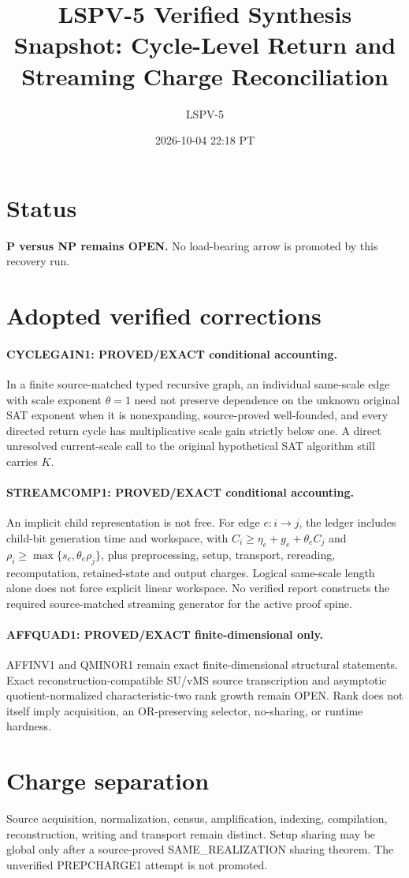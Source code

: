 \documentclass[11pt]{article}
\title{LSPV-5 Verified Synthesis Snapshot: Cycle-Level Return and Streaming Charge Reconciliation}
\author{LSPV-5}
\date{2026-10-04 22:18 PT}
\begin{document}
\maketitle
\section*{Status}
\textbf{P versus NP remains OPEN.} No load-bearing arrow is promoted by this recovery run.
\section*{Adopted verified corrections}
\paragraph{CYCLEGAIN1: PROVED/EXACT conditional accounting.} In a finite source-matched typed recursive graph, an individual same-scale edge with scale exponent $\theta=1$ need not preserve dependence on the unknown original SAT exponent when it is nonexpanding, source-proved well-founded, and every directed return cycle has multiplicative scale gain strictly below one. A direct unresolved current-scale call to the original hypothetical SAT algorithm still carries $K$.
\paragraph{STREAMCOMP1: PROVED/EXACT conditional accounting.} An implicit child representation is not free. For edge $e:i\to j$, the ledger includes child-bit generation time and workspace, with $C_i\ge \eta_e+g_e+\theta_e C_j$ and $\rho_i\ge\max\{s_e,\theta_e\rho_j\}$, plus preprocessing, setup, transport, rereading, recomputation, retained-state and output charges. Logical same-scale length alone does not force explicit linear workspace. No verified report constructs the required source-matched streaming generator for the active proof spine.
\paragraph{AFFQUAD1: PROVED/EXACT finite-dimensional only.} AFFINV1 and QMINOR1 remain exact finite-dimensional structural statements. Exact reconstruction-compatible SU/vMS source transcription and asymptotic quotient-normalized characteristic-two rank growth remain OPEN. Rank does not itself imply acquisition, an OR-preserving selector, no-sharing, or runtime hardness.
\section*{Charge separation}
Source acquisition, normalization, census, amplification, indexing, compilation, reconstruction, writing and transport remain distinct. Setup sharing may be global only after a source-proved SAME\_REALIZATION sharing theorem. The unverified PREPCHARGE1 attempt is not promoted.
\end{document}
